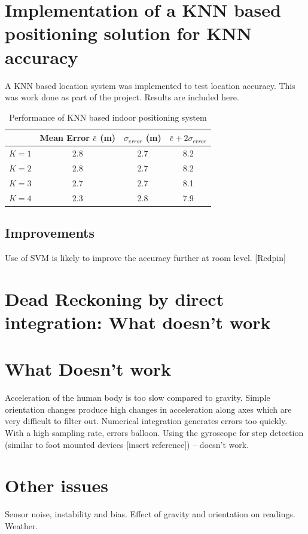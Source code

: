 \section{Implementation of a KNN based positioning solution for KNN accuracy\label{sec:knn_pos}}

A KNN based location system was implemented to test location accuracy. 
This was work done as part of the project. Results are included here.

\begin{table}[h]
    \centering
    \caption{Performance of KNN based indoor positioning system \label{tab:knnperf}}
    \begin{tabular}{|l|c|c|c|}
    \hline
              & Mean Error $\bar{e}$ (m) & $\sigma_{error}$ (m) & $\bar{e} + 2 \sigma_{error}$ \\
    \hline
    \hline
    $K = 1$    & 2.8 & 2.7 & 8.2 \\
    $K = 2$    & 2.8 & 2.7 & 8.2 \\
    $K = 3$    & 2.7 & 2.7 & 8.1 \\
    $K = 4$    & 2.3 & 2.8 & 7.9 \\
    \hline
    \end{tabular}

\end{table}


\subsection{Improvements}
Use of SVM is likely to improve the accuracy further at room level. [Redpin]


\section{Dead Reckoning by direct integration: What doesn't work}
\section{What Doesn't work}
Acceleration of the human body is too slow compared to gravity. Simple orientation changes produce high changes in acceleration along axes which are very difficult to filter out.
Numerical integration generates errors too quickly. With a high sampling rate, errors balloon.
Using the gyroscope for step detection (similar to foot mounted devices [insert reference]) – doesn’t work.


\section{Other issues}
Sensor noise, instability and bias. Effect of gravity and orientation on readings. Weather.


